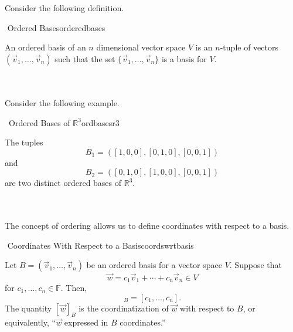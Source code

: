         Consider the following definition.
        \begin{definition}{\Stop\,\,Ordered Bases}{orderedbases}
            
            An ordered basis of an \(n\) dimensional vector space \(V\) is an \(n\)-tuple of vectors \((\vec{v}_1,\ldots,\vec{v}_n)\) such that the set \(\{\vec{v}_1,\ldots,\vec{v}_n\}\) is a basis for \(V\).

        \end{definition}
        \vphantom
        \\
        \\
        Consider the following example.
        \begin{example}{\Difficulty\,\Difficulty\,\,Ordered Bases of \(\mathbb{R}^3\)}{ordbasesr3}

            The tuples
            \begin{equation*}
                B_1=([1,0,0],[0,1,0],[0,0,1])
            \end{equation*}
            and
            \begin{equation*}
                B_2=([0,1,0],[1,0,0],[0,0,1])
            \end{equation*}
            are two distinct ordered bases of \(\mathbb{R}^3\).

        \end{example}
        \vphantom
        \\
        \\
        The concept of ordering allows us to define coordinates with respect to a basis.
        \begin{definition}{\Stop\,\,Coordinates With Respect to a Basis}{coordswrtbasis}
            
            Let \(B=(\vec{v}_1,\ldots,\vec{v}_n)\) be an ordered basis for a vector space \(V\). Suppose that
            \begin{equation*}
                \vec{w}=c_1\vec{v}_1+\cdots+c_n\vec{v}_n\in V
            \end{equation*}
            for \(c_1,\ldots,c_n\in\mathbb{F}\). Then, 
            \begin{equation*}
                [\vec{w}]_B=[c_1,\ldots,c_n].
            \end{equation*}
            The quantity \([\vec{w}]_B\) is the coordinatization of \(\vec{w}\) with respect to \(B\), or equivalently, ``\(\vec{w}\) expressed in \(B\) coordinates.''

        \end{definition}
